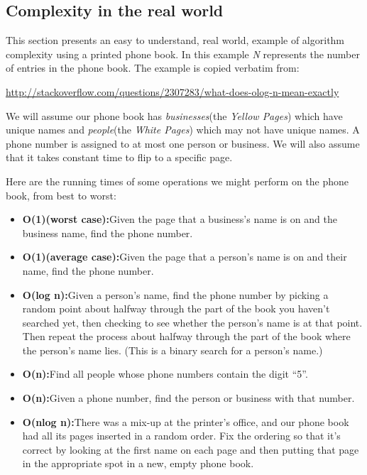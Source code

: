 \subsection{Complexity in the real world}

This section presents an easy to understand, real world,  example of algorithm
complexity using a printed phone book.  In this example \textit{N} represents
the number of entries in the phone book.  The example is copied verbatim from:


\url{http://stackoverflow.com/questions/2307283/what-does-olog-n-mean-exactly}

\begin{displayquote}

{We will assume our phone book has \emph{{businesses}}(the \textit{Yellow
Pages}) which have unique names and \emph{{people}}(the \textit{White Pages})
which may not have unique names. A phone number is assigned to at most
one person or business. We will also assume that it takes constant time
to flip to a specific page.}

{Here are the running times of some operations we might perform on the
phone book, from best to worst:}

\begin{itemize}
\item
  \textbf{{O(1)(worst case):}}{Given the page that a business's
  name is on and the business name, find the phone number.}
\item
  \textbf{{O(1)(average case):}}{Given the page that a person's
  name is on and their name, find the phone number.}
\item
  \textbf{{O(log n):}}{Given a person's name, find the phone
  number by picking a random point about halfway through the part of the
  book you haven't searched yet, then checking to see whether the
  person's name is at that point. Then repeat the process about halfway
  through the part of the book where the person's name lies. (This is a
  binary search for a person's name.)}
\item
  \textbf{{O(n):}}{Find all people whose phone numbers contain the
  digit ``5''.}
\item
  \textbf{{O(n):}}{Given a phone number, find the person or
  business with that number.}
\item
  \textbf{{O(nlog n):}}{There was a mix-up at the printer's
  office, and our phone book had all its pages inserted in a random
  order. Fix the ordering so that it's correct by looking at the first
  name on each page and then putting that page in the appropriate spot
  in a new, empty phone book.}
\end{itemize}


\end{displayquote}
